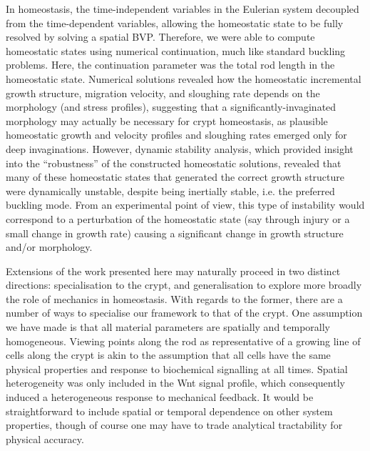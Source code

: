 In homeostasis, the time-independent variables in the Eulerian system decoupled from the time-dependent variables, allowing the homeostatic state to be fully resolved by solving a spatial BVP. Therefore, we were able to compute homeostatic states using numerical continuation, much like standard buckling problems. Here, the continuation parameter was the total rod length in the homeostatic state. Numerical solutions revealed how the homeostatic incremental growth structure, migration velocity, and sloughing rate depends on the morphology (and stress profiles), suggesting that a significantly-invaginated morphology may actually be necessary for crypt homeostasis, as plausible homeostatic growth and velocity profiles and sloughing rates emerged only for deep invaginations. However, dynamic stability analysis, which provided insight into the ``robustness'' of the constructed homeostatic solutions, revealed that many of these homeostatic states that generated the correct growth structure were dynamically unstable, despite being inertially stable, i.e. the preferred buckling mode. From an experimental point of view, this type of instability would correspond to a perturbation of the homeostatic state (say through injury or a small change in growth rate) causing a significant change in growth structure and/or morphology.

Extensions of the work presented here may naturally proceed in two distinct directions: specialisation to the crypt, and generalisation to explore more broadly the role of mechanics in homeostasis.
%
With regards to the former, there are a number of ways to specialise our framework to that of the crypt. One assumption we have made is that all material parameters are spatially and temporally homogeneous. Viewing points along the rod as representative of a growing line of cells along the crypt is akin to the assumption that all cells have the same physical properties and response to biochemical signalling at all times. Spatial heterogeneity was only included in the Wnt signal profile, which consequently induced a heterogeneous response to mechanical feedback. It would be straightforward to include spatial or temporal dependence on other system properties, though of course one may have to trade analytical tractability for physical accuracy. 

